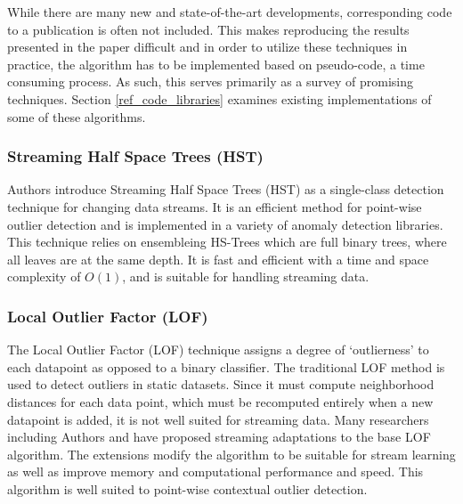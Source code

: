 While there are many new and state-of-the-art developments, corresponding code to a publication is often not included. This makes reproducing the results presented in the paper difficult and in order to utilize these techniques in practice, the algorithm has to be implemented based on pseudo-code, a time consuming process. As such, this serves primarily as a survey of promising techniques. Section \ref{ref_code_libraries} examines existing implementations of some of these algorithms.

\subsubsection{Streaming Half Space Trees (HST)}
Authors \cite{fast-anomaly-detection-streaming} introduce Streaming Half Space Trees (HST) as a single-class detection technique for changing data streams. It is an efficient method for point-wise outlier detection and is implemented in a variety of anomaly detection libraries. This technique relies on ensembleing HS-Trees which are full binary trees, where all leaves are at the same depth. It is fast and efficient with a time and space complexity of $O(1)$, and is suitable for handling streaming data.



\subsubsection{Local Outlier Factor (LOF)}

The Local Outlier Factor (LOF) technique assigns a degree of `outlierness' to each datapoint as opposed to a binary classifier. The traditional LOF method is used to detect outliers in static datasets. Since it must compute neighborhood distances for each data point, which must be recomputed entirely when a new datapoint is added, it is not well suited for streaming data. Many researchers including Authors \cite{dilof-data-streams} and \cite{fast-memory-efficent-lof-milof} have proposed streaming adaptations to the base LOF algorithm. The extensions modify the algorithm to be suitable for stream learning as well as improve memory and computational performance and speed. This algorithm is well suited to point-wise contextual outlier detection.

